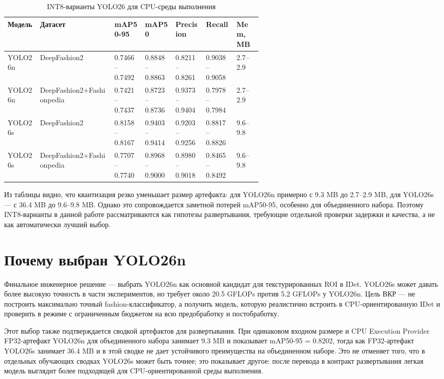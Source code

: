 \documentclass[12pt,a4paper,oneside,openany]{report}
\begin{document}
\begin{table}[H]\centering\caption{INT8-варианты YOLO26 для CPU-среды выполнения}\label{tab:yolo_model_zoo_int8}\scriptsize\begin{tabularx}{\linewidth}{@{}lY C{0.12\linewidth}C{0.12\linewidth}C{0.12\linewidth}C{0.12\linewidth}C{0.10\linewidth}@{}}\toprule
Модель & Датасет & mAP50-95 & mAP50 & Precision & Recall & Mem, MB \\
\midrule
YOLO26n & DeepFashion2 & 0.7466--0.7492 & 0.8848--0.8863 & 0.8211--0.8261 & 0.9038--0.9058 & 2.7--2.9 \\
YOLO26n & DeepFashion2+Fashionpedia & 0.7421--0.7437 & 0.8723--0.8736 & 0.9373--0.9404 & 0.7978--0.7984 & 2.7--2.9 \\
YOLO26s & DeepFashion2 & 0.8158--0.8167 & 0.9403--0.9414 & 0.9203--0.9256 & 0.8817--0.8826 & 9.6--9.8 \\
YOLO26s & DeepFashion2+Fashionpedia & 0.7707--0.7740 & 0.8968--0.9000 & 0.8980--0.9018 & 0.8465--0.8492 & 9.6--9.8 \\
\bottomrule\end{tabularx}
\end{table}

Из таблицы видно, что квантизация резко уменьшает размер артефакта: для YOLO26n примерно с 9.3 MB до 2.7--2.9 MB, для YOLO26s --- с 36.4 MB до 9.6--9.8 MB. Однако это сопровождается заметной потерей mAP50-95, особенно для объединенного набора. Поэтому INT8-варианты в данной работе рассматриваются как гипотезы развертывания, требующие отдельной проверки задержки и качества, а не как автоматически лучший выбор.

\section{Почему выбран YOLO26n}

Финальное инженерное решение --- выбрать YOLO26n как основной кандидат для текстурированных ROI в IDet. YOLO26s может давать более высокую точность в части экспериментов, но требует около 20.5 GFLOPs против 5.2 GFLOPs у YOLO26n. Цель ВКР --- не построить максимально точный fashion-классификатор, а получить модель, которую реалистично встроить в CPU-ориентированную IDet и проверить в режиме с ограниченным бюджетом на всю предобработку и постобработку.

Этот выбор также подтверждается сводкой артефактов для развертывания. При одинаковом входном размере и CPU Execution Provider FP32-артефакт YOLO26n для объединенного набора занимает 9.3 MB и показывает mAP50-95 = 0.8202, тогда как FP32-артефакт YOLO26s занимает 36.4 MB и в этой сводке не дает устойчивого преимущества на объединенном наборе. Это не отменяет того, что в отдельных обучающих сводках YOLO26s может быть точнее; это показывает другое: после перевода в контракт развертывания легкая модель выглядит более подходящей для CPU-ориентированной среды выполнения.
\end{document}
